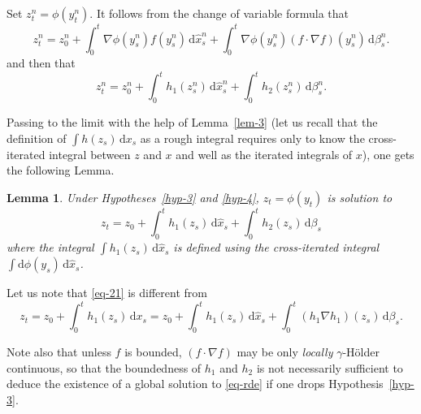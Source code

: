 \documentclass[a4paper,12pt]{article}
\newtheorem{lemma}[theorem]{Lemma}
\theoremstyle{definition}
\newcommand{\vd}{\,\mathrm{d}}
\newcommand{\dd}{\mathrm{d}}
\begin{document}
Set 
$z^n_t=\phi(y^n_t)$. It follows from the change of variable formula
that
\begin{equation*}
z^n_t=z^n_0+\int_0^t \nabla \phi(y_s^n)f(y_s^n)\vd\widehat{x}^n_s
+\int_0^t \nabla \phi(y_s^n)(f\cdot\nabla f)(y_s^n)\vd \beta_s^n.
\end{equation*}
and then that 
\begin{equation*}
z^n_t=z^n_0+\int_0^t h_1(z^n_s)\vd\widehat{x}^n_s
+\int_0^t h_2(z^n_s)\vd \beta^n_s.
\end{equation*}

Passing to the limit with the help of Lemma~\ref{lem-3}
(let us recall that the definition of $\int h(z_s)\vd x_s$ as
a rough integral requires only to know the cross-iterated integral
between $z$ and $x$ and well as the iterated integrals of $x$),
one gets the following Lemma. 

\begin{lemma}
Under Hypotheses~\ref{hyp-3} and \ref{hyp-4}, 
$z_t=\phi(y_t)$ is solution to 
\begin{equation}
\label{eq-21}
z_t=z_0+\int_0^t h_1(z_s)\vd\widehat{x}_s
+\int_0^t h_2(z_s)\vd \beta_s
\end{equation}
where the integral $\int h_1(z_s)\vd \widehat{x}_s$
is defined using the cross-iterated integral $\int \dd\phi(y_s)\vd \widehat{x}_s$.
\end{lemma}

Let us note that \eqref{eq-21} is different from 
\begin{equation*}
z_t=z_0+\int_0^t h_1(z_s)\vd x_s=z_0+\int_0^t h_1(z_s)\vd \widehat{x}_s
+\int_0^t (h_1\nabla h_1)(z_s)\vd \beta_s.
\end{equation*}

Note also that unless $f$ is bounded, $(f\cdot\nabla f)$ 
may be only \emph{locally} $\gamma$-Hölder continuous, 
so that the boundedness of $h_1$ and $h_2$ is not necessarily 
sufficient to deduce the existence of a global solution 
to \eqref{eq-rde} if one drops Hypothesis~\ref{hyp-3}.



\end{document}
